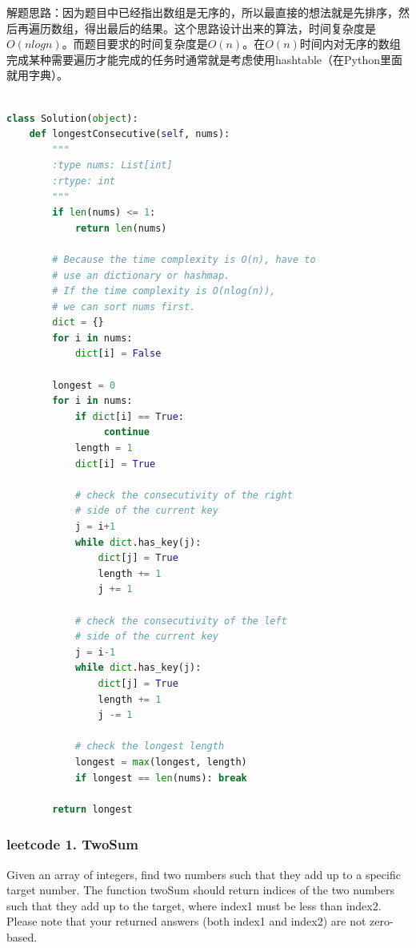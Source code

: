 \documentclass[a4paper,10pt]{article}
\begin{document}
\begin{CJK*}{UTF8}{gbsn}
\noindent 解题思路：因为题目中已经指出数组是无序的，所以最直接的想法就是先排序，然后再遍历数组，得出最后的结果。这个思路设计出来的算法，时间复杂度是$O(nlogn)$。而题目要求的时间复杂度是$O(n)$。在$O(n)$时间内对无序的数组完成某种需要遍历才能完成的任务时通常就是考虑使用hashtable（在Python里面就用字典）。
\end{CJK*}

\begin{lstlisting}[language=Python, caption=Problem128. Longest Consecutive Sequence]

class Solution(object):
    def longestConsecutive(self, nums):
        """
        :type nums: List[int]
        :rtype: int
        """
        if len(nums) <= 1:
            return len(nums)
        
        # Because the time complexity is O(n), have to 
        # use an dictionary or hashmap. 
        # If the time complexity is O(nlog(n)), 
        # we can sort nums first.
        dict = {}   
        for i in nums:
            dict[i] = False
        
        longest = 0
        for i in nums:
            if dict[i] == True:
                 continue
            length = 1
            dict[i] = True
            
            # check the consecutivity of the right 
            # side of the current key
            j = i+1
            while dict.has_key(j):
                dict[j] = True
                length += 1
                j += 1
            
            # check the consecutivity of the left 
            # side of the current key
            j = i-1
            while dict.has_key(j):
                dict[j] = True
                length += 1
                j -= 1
            
            # check the longest length
            longest = max(longest, length)
            if longest == len(nums): break
        
        return longest
\end{lstlisting}


\subsubsection{leetcode 1. TwoSum}
Given an array of integers, find two numbers such that they add up to a specific target number. The function twoSum should return indices of the two numbers such that they add up to the target, where index1 must be less than index2. Please note that your returned answers (both index1 and index2) are not zero-based. \\
\end{document}
